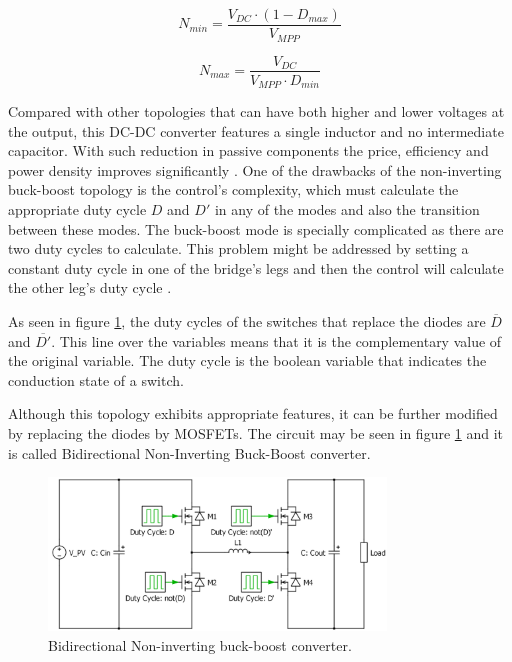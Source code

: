 \begin{equation} \label{boost_number_of_panels}
 N_{min} = \frac{V_{DC} \cdot (1 - D_{max})}{V_{MPP}}
\end{equation}

\begin{equation} \label{buck_number_of_panels}
 N_{max} = \frac{V_{DC}}{V_{MPP} \cdot D_{min}}
\end{equation}

Compared with other topologies that can have both higher and lower voltages at the output, this DC-DC converter features a single inductor and no intermediate capacitor. With such reduction in passive components the price, efficiency and power density improves significantly \cite{underthehood}. One of the drawbacks of the non-inverting buck-boost topology is the control's complexity, which must calculate the appropriate duty cycle $D$ and $D'$ in any of the modes and also the transition between these modes. The buck-boost mode is specially complicated as there are two duty cycles to calculate. This problem might be addressed by setting a constant duty cycle in one of the bridge's legs and then the control will calculate the other leg's duty cycle  \cite{AN4449_ST}.

As seen in figure \ref{BID_N_INV_BB_SCHEMATIC}, the duty cycles of the switches that replace the diodes are $\overline{D}$ and $\overline{D'}$. This line over the variables means that it is the complementary value of the original variable. The duty cycle is the boolean variable that indicates the conduction state of a switch. 
		
Although this topology exhibits appropriate features, it can be further modified by replacing the diodes by MOSFETs. The circuit may be seen in figure \ref{BID_N_INV_BB_SCHEMATIC} and it is called Bidirectional Non-Inverting Buck-Boost converter.

\begin{figure}[H]
	\begin{center}
		\includegraphics[width=0.8\textwidth]{../Pictures/BID_H_B_BB}
		\caption{Bidirectional Non-inverting buck-boost converter.}
		\label{BID_N_INV_BB_SCHEMATIC}
	\end{center}
\end{figure}


